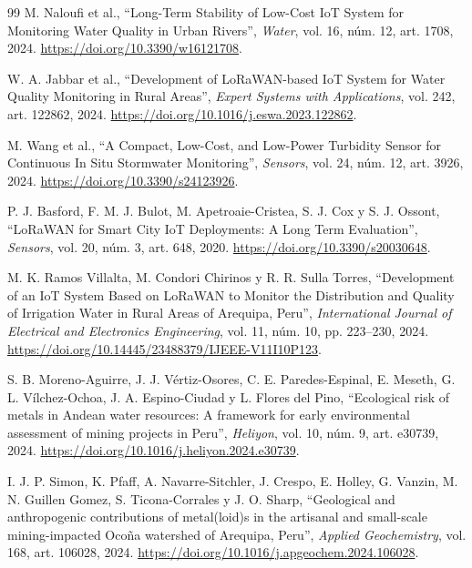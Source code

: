 \documentclass[11pt,a4paper]{article}
\begin{document}
\begin{thebibliography}{99}
M. Naloufi et al.,
``Long-Term Stability of Low-Cost IoT System for Monitoring Water Quality in Urban Rivers'',
\emph{Water},
vol. 16, núm. 12, art. 1708, 2024.
\url{https://doi.org/10.3390/w16121708}.

W. A. Jabbar et al.,
``Development of LoRaWAN-based IoT System for Water Quality Monitoring in Rural Areas'',
\emph{Expert Systems with Applications},
vol. 242, art. 122862, 2024.
\url{https://doi.org/10.1016/j.eswa.2023.122862}.

M. Wang et al.,
``A Compact, Low-Cost, and Low-Power Turbidity Sensor for Continuous In Situ Stormwater Monitoring'',
\emph{Sensors},
vol. 24, núm. 12, art. 3926, 2024.
\url{https://doi.org/10.3390/s24123926}.

P. J. Basford, F. M. J. Bulot, M. Apetroaie-Cristea,
S. J. Cox y S. J. Ossont,
``LoRaWAN for Smart City IoT Deployments: A Long Term Evaluation'',
\emph{Sensors},
vol. 20, núm. 3, art. 648, 2020.
\url{https://doi.org/10.3390/s20030648}.

M. K. Ramos Villalta, M. Condori Chirinos y R. R. Sulla Torres,
``Development of an IoT System Based on LoRaWAN to Monitor the Distribution and Quality of Irrigation Water in Rural Areas of Arequipa, Peru'',
\emph{International Journal of Electrical and Electronics Engineering},
vol. 11, núm. 10, pp. 223--230, 2024.
\url{https://doi.org/10.14445/23488379/IJEEE-V11I10P123}.


S. B. Moreno-Aguirre, J. J. Vértiz-Osores,
C. E. Paredes-Espinal, E. Meseth,
G. L. Vílchez-Ochoa, J. A. Espino-Ciudad
y L. Flores del Pino,
``Ecological risk of metals in Andean water resources:
A framework for early environmental assessment of mining projects in Peru'',
\emph{Heliyon},
vol. 10, núm. 9, art. e30739, 2024.
\url{https://doi.org/10.1016/j.heliyon.2024.e30739}.

I. J. P. Simon, K. Pfaff, A. Navarre-Sitchler,
J. Crespo, E. Holley, G. Vanzin,
M. N. Guillen Gomez, S. Ticona-Corrales
y J. O. Sharp,
``Geological and anthropogenic contributions of metal(loid)s in the artisanal and small-scale mining-impacted Ocoña watershed of Arequipa, Peru'',
\emph{Applied Geochemistry},
vol. 168, art. 106028, 2024.
\url{https://doi.org/10.1016/j.apgeochem.2024.106028}.


\end{thebibliography}
\end{document}
